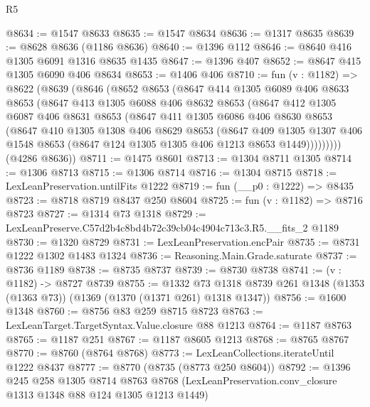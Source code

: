 \begin{lexlean}{R5}
\begin{coremodule}
@8634 := @1547 @8633
@8635 := @1547 @8634
@8636 := @1317 @8635
@8639 := @8628 @8636 (@1186 @8636)
@8640 := @1396 @112
@8646 := @8640 @416 @1305 @6091 @1316 @8635 @1435
@8647 := @1396 @407
@8652 := @8647 @415 @1305 @6090 @406 @8634
@8653 := @1406 @406
@8710 := fun (v : @1182) =>
  @8622
    (@8639
      (@8646
        (@8652
          @8653
          (@8647
            @414
            @1305
            @6089
            @406
            @8633
            @8653
            (@8647
              @413
              @1305
              @6088
              @406
              @8632
              @8653
              (@8647
                @412
                @1305
                @6087
                @406
                @8631
                @8653
                (@8647
                  @411
                  @1305
                  @6086
                  @406
                  @8630
                  @8653
                  (@8647
                    @410
                    @1305
                    @1308
                    @406
                    @8629
                    @8653
                    (@8647
                      @409
                      @1305
                      @1307
                      @406
                      @1548
                      @8653
                      (@8647 @124 @1305 @1305 @406 @1213 @8653 @1449)))))))))
      (@4286 @8636))
@8711 := @1475 @8601
@8713 := @1304 @8711 @1305
@8714 := @1306 @8713
@8715 := @1306 @8714
@8716 := @1304 @8715
@8718 := LexLeanPreservation.untilFits @1222
@8719 := fun (__p0 : @1222) => @8435
@8723 := @8718 @8719 @8437 @250 @8604
@8725 := fun (v : @1182) => @8716 @8723
@8727 := @1314 @73 @1318
@8729 := LexLeanPreserve.C57d2b4c8bd4b72c39cb04c4904c713c3.R5.__fits_2 @1189
@8730 := @1320 @8729
@8731 := LexLeanPreservation.encPair
@8735 := @8731 @1222 @1302 @1483 @1324
@8736 := Reasoning.Main.Grade.saturate
@8737 := @8736 @1189
@8738 := @8735 @8737
@8739 := @8730 @8738
@8741 := (v : @1182) -> @8727 @8739
@8755 := @1332
    @73
    @1318
    @8739
    @261
    @1348
    (@1353 (@1363 @73))
    (@1369 (@1370 (@1371 @261) @1318 @1347))
@8756 := @1600 @1348
@8760 := @8756 @83 @259 @8715 @8723
@8763 := LexLeanTarget.TargetSyntax.Value.closure @88 @1213
@8764 := @1187 @8763
@8765 := @1187 @251
@8767 := @1187 @8605 @1213
@8768 := @8765 @8767
@8770 := @8760 (@8764 @8768)
@8773 := LexLeanCollections.iterateUntil @1222 @8437
@8777 := @8770 (@8735 (@8773 @250 @8604))
@8792 := @1396
    @245
    @258
    @1305
    @8714
    @8763
    @8768
    (LexLeanPreservation.conv_closure @1313 @1348 @88 @124 @1305 @1213 @1449)

\end{coremodule}
\end{lexlean}
